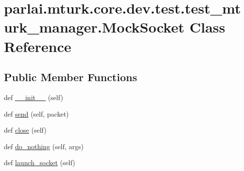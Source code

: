 \hypertarget{classparlai_1_1mturk_1_1core_1_1dev_1_1test_1_1test__mturk__manager_1_1MockSocket}{}\section{parlai.\+mturk.\+core.\+dev.\+test.\+test\+\_\+mturk\+\_\+manager.\+Mock\+Socket Class Reference}
\label{classparlai_1_1mturk_1_1core_1_1dev_1_1test_1_1test__mturk__manager_1_1MockSocket}
\subsection*{Public Member Functions}
\begin{DoxyCompactItemize}
\item 
def \hyperlink{classparlai_1_1mturk_1_1core_1_1dev_1_1test_1_1test__mturk__manager_1_1MockSocket_a9378739ae408c36e4b99bf5cdeca4c64}{\+\_\+\+\_\+init\+\_\+\+\_\+} (self)
\item 
def \hyperlink{classparlai_1_1mturk_1_1core_1_1dev_1_1test_1_1test__mturk__manager_1_1MockSocket_ae980d699632b1d1a08c9f6ecfd2cb9da}{send} (self, packet)
\item 
def \hyperlink{classparlai_1_1mturk_1_1core_1_1dev_1_1test_1_1test__mturk__manager_1_1MockSocket_a534b5b379902dd04fbface8b0ad3a5bf}{close} (self)
\item 
def \hyperlink{classparlai_1_1mturk_1_1core_1_1dev_1_1test_1_1test__mturk__manager_1_1MockSocket_ab03ad0630dca832ec066900b06b2cdc9}{do\+\_\+nothing} (self, args)
\item 
def \hyperlink{classparlai_1_1mturk_1_1core_1_1dev_1_1test_1_1test__mturk__manager_1_1MockSocket_a4bd63aaeb963b7fa48dcc523633ec9ac}{launch\+\_\+socket} (self)
\end{DoxyCompactItemize}
